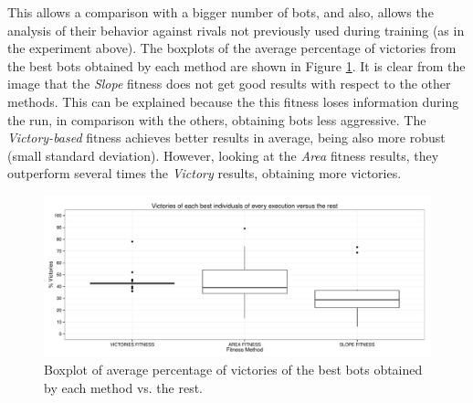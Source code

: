 \documentclass[preprint]{elsarticle}
\begin{document}
This allows a comparison with a bigger number of bots, and also,
allows the analysis of their behavior against rivals not previously
used during training (as in the experiment above). 
The boxplots of the average percentage of victories from the best bots obtained by each method are shown in Figure \ref{figura:boxplotvictories}. It is clear from the image that the \textit{Slope} fitness does not get good results with respect to the other methods. This can be explained because the this fitness loses information during the run, in comparison with the others, obtaining bots less aggressive. 
The \textit{Victory-based} fitness achieves better results in average, being also more robust (small standard deviation). However, looking at the \textit{Area} fitness results, they outperform several times the \textit{Victory} results, obtaining more victories.


 \begin{figure}[ht]
 \begin{center}
   \includegraphics[width=12cm]{nuevas_imgs/batallas_Boxplot.pdf}
 \end{center}
 \caption{Boxplot of average percentage of victories of the best bots obtained by each method vs. the rest.}
 \label{figura:boxplotvictories}
 \end{figure}
\end{document}
